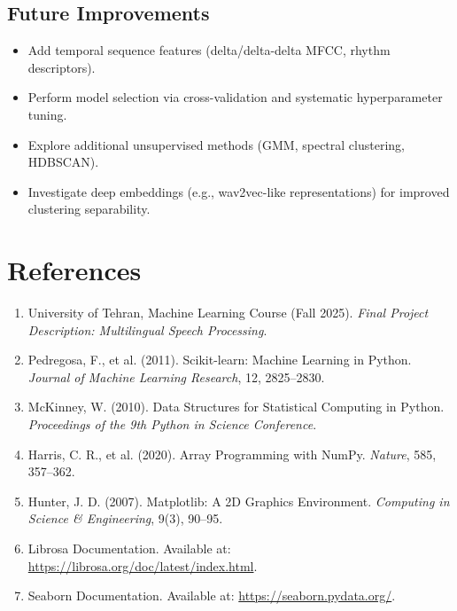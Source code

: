 \documentclass[a4paper,14pt]{extarticle}
\begin{document}
\subsection*{Future Improvements}
\begin{itemize}
    \item Add temporal sequence features (delta/delta-delta MFCC, rhythm descriptors).
    \item Perform model selection via cross-validation and systematic hyperparameter tuning.
    \item Explore additional unsupervised methods (GMM, spectral clustering, HDBSCAN).
    \item Investigate deep embeddings (e.g., wav2vec-like representations) for improved clustering separability.
\end{itemize}

\newpage

\section{References}

\begin{enumerate}
    \item University of Tehran, Machine Learning Course (Fall 2025). \textit{Final Project Description: Multilingual Speech Processing}.
    \item Pedregosa, F., et al. (2011). Scikit-learn: Machine Learning in Python. \textit{Journal of Machine Learning Research}, 12, 2825--2830.
    \item McKinney, W. (2010). Data Structures for Statistical Computing in Python. \textit{Proceedings of the 9th Python in Science Conference}.
    \item Harris, C. R., et al. (2020). Array Programming with NumPy. \textit{Nature}, 585, 357--362.
    \item Hunter, J. D. (2007). Matplotlib: A 2D Graphics Environment. \textit{Computing in Science \& Engineering}, 9(3), 90--95.
    \item Librosa Documentation. Available at: \url{https://librosa.org/doc/latest/index.html}.
    \item Seaborn Documentation. Available at: \url{https://seaborn.pydata.org/}.
\end{enumerate}
\end{document}
